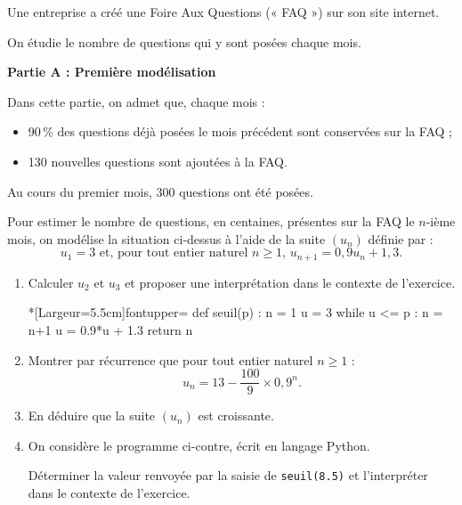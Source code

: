 Une entreprise a créé une Foire Aux Questions (« FAQ ») sur son site internet.

\smallskip

On étudie le nombre de questions qui y sont posées chaque mois. 

\bigskip

\textbf{Partie A : Première modélisation}

\medskip

Dans cette partie, on admet que, chaque mois :

\begin{itemize}
	\item 90\,\% des questions déjà posées le mois précédent sont conservées sur la FAQ ;
	\item 130 nouvelles questions sont ajoutées à la FAQ.
\end{itemize}

Au cours du premier mois, 300 questions ont été posées. 

\smallskip

Pour estimer le nombre de questions, en centaines, présentes sur la FAQ le $n$-ième mois, on modélise la situation ci-dessus à l’aide de la suite $\left(u_n\right)$ définie par :%
\[ u_1=3 \text{ et, pour tout entier naturel } n \geqslant 1\text{, } u_{n+1}=0,9u_n+1,3. \]
%
\begin{enumerate}
	\item Calculer $u_2$ et $u_3$ et proposer une interprétation dans le contexte de l’exercice.
\begin{wrapstuff}[r,abovesep=0.75\baselineskip]
\begin{CodePythonLstAlt}*[Largeur=5.5cm]{fontupper=\scriptsize}
def seuil(p) :
	n = 1
	u = 3
	while u <= p :
		n = n+1
		u = 0.9*u + 1.3
	return n
\end{CodePythonLstAlt}
\end{wrapstuff}
	\item Montrer par récurrence que pour tout entier naturel $n\geqslant 1$ :%
	\[ u_{n} = 13 - \frac{100}{9} \times 0,9^n. \]
	\item En déduire que la suite $\left(u_n\right)$ est croissante.
	\item On considère le programme ci-contre, écrit en langage \textsf{Python}.
	
	\smallskip
	
	Déterminer la valeur renvoyée par la saisie de \texttt{seuil(8.5)} et l’interpréter dans le contexte de l’exercice. 
\end{enumerate}

